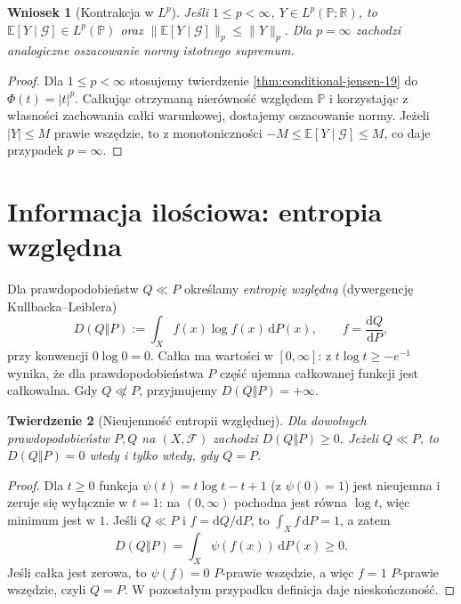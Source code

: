 \documentclass[11pt,a4paper,oneside]{book}
\numberwithin{equation}{chapter}
\theoremstyle{plain}
\newtheorem{twierdzenie}{Twierdzenie}[chapter]
\newtheorem{wniosek}[twierdzenie]{Wniosek}
\theoremstyle{definition}
\theoremstyle{remark}
\begin{document}
\begin{wniosek}[Kontrakcja w $L^p$]
\label{cor:conditional-lp-19}
Jeśli $1\le p<\infty$, $Y\in L^p(\mathbb P;\mathbb R)$,
to $\mathbb E[Y\mid\mathcal G]\in L^p(\mathbb P)$ oraz
$\|\mathbb E[Y\mid\mathcal G]\|_p\le\|Y\|_p$.
Dla $p=\infty$ zachodzi analogiczne oszacowanie
normy istotnego supremum.
\end{wniosek}
\begin{proof}
Dla $1\le p<\infty$ stosujemy twierdzenie
\ref{thm:conditional-jensen-19} do $\Phi(t)=|t|^p$.
Całkując otrzymaną nierówność względem $\mathbb P$
i korzystając z własności zachowania całki warunkowej,
dostajemy oszacowanie normy. Jeżeli $|Y|\le M$ prawie
wszędzie, to z monotoniczności
$-M\le\mathbb E[Y\mid\mathcal G]\le M$,
co daje przypadek $p=\infty$.
\end{proof}

\section{Informacja ilościowa: entropia względna}
Dla prawdopodobieństw $Q\ll P$ określamy
\emph{entropię względną} (dywergencję Kullbacka--Leiblera)
\[
 D(Q\Vert P):=\int_X f(x)\log f(x)\,\mathrm dP(x),
 \qquad f=\frac{\mathrm dQ}{\mathrm dP},
\]
przy konwencji $0\log0=0$. Całka ma wartości
w $[0,\infty]$: z $t\log t\ge -e^{-1}$
wynika, że dla prawdopodobieństwa $P$ część ujemna
całkowanej funkcji jest całkowalna. Gdy $Q\not\ll P$,
przyjmujemy $D(Q\Vert P)=+\infty$.

\begin{twierdzenie}[Nieujemność entropii względnej]
\label{thm:gibbs-19}
Dla dowolnych prawdopodobieństw $P,Q$ na $(X,\mathcal F)$
zachodzi $D(Q\Vert P)\ge0$. Jeżeli $Q\ll P$, to
$D(Q\Vert P)=0$ wtedy i tylko wtedy, gdy $Q=P$.
\end{twierdzenie}
\begin{proof}
Dla $t\ge0$ funkcja $\psi(t)=t\log t-t+1$
(z $\psi(0)=1$) jest nieujemna i zeruje się wyłącznie
w $t=1$: na $(0,\infty)$ pochodna jest równa $\log t$,
więc minimum jest w $1$. Jeśli $Q\ll P$ i $f=\mathrm dQ/\mathrm dP$,
to $\int_Xf\,\mathrm dP=1$, a zatem
\[
 D(Q\Vert P)=\int_X\psi(f(x))\,\mathrm dP(x)\ge0.
\]
Jeśli całka jest zerowa, to $\psi(f)=0$ $P$-prawie wszędzie,
a więc $f=1$ $P$-prawie wszędzie, czyli $Q=P$.
W pozostałym przypadku definicja daje nieskończoność.
\end{proof}
\end{document}
